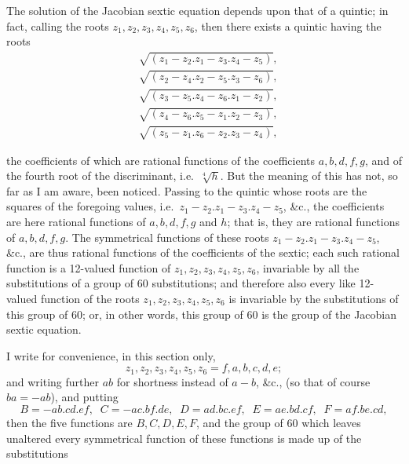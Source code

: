 \documentclass[11pt]{article}
\begin{document}
\medskip\noindent
The solution of the Jacobian sextic equation depends upon that of a
quintic; in fact, calling the roots $z_{1},z_{2},z_{3},z_{4},z_{5},z_{6}$,
then there exists a quintic having the roots
\begin{align*}
  & \sqrt{(z_{1}-z_{2}.z_{1}-z_{3}.z_{4}-z_{5})},\\
  & \sqrt{(z_{2}-z_{4}.z_{2}-z_{5}.z_{3}-z_{6})},\\
  & \sqrt{(z_{3}-z_{5}.z_{4}-z_{6}.z_{1}-z_{2})},\\
  & \sqrt{(z_{4}-z_{6}.z_{5}-z_{1}.z_{2}-z_{3})},\\
  & \sqrt{(z_{5}-z_{1}.z_{6}-z_{2}.z_{3}-z_{4})},
\end{align*}

\newpage
\noindent
the coefficients of which are rational functions of the
coefficients $a,b,d,f,g$, and of the fourth root of the
discriminant, i.e.\ $\sqrt[4]{h}$.  But the meaning of this has
not, so far as I am aware, been noticed.  Passing to the quintic
whose roots are the squares of the foregoing values, i.e.\
$z_{1}-z_{2}.z_{1}-z_{3}.z_{4}-z_{5}$, \&c., the coefficients are
here rational functions of $a,b,d,f,g$ and $h$; that is, they are
rational functions of $a,b,d,f,g$.  The symmetrical functions of
these roots $z_{1}-z_{2}.z_{1}-z_{3}.z_{4}-z_{5}$, \&c., are thus
rational functions of the coefficients of the sextic; each such
rational function is a 12-valued function of
$z_{1},z_{2},z_{3},z_{4},z_{5},z_{6}$, invariable by all the
substitutions of a group of 60 substitutions; and therefore also
every like 12-valued function of the roots
$z_{1},z_{2},z_{3},z_{4},z_{5},z_{6}$ is invariable by the
substitutions of this group of 60; or, in other words, this group
of 60 is the group of the Jacobian sextic equation.

\medskip
I write for convenience, in this section only,
\[
  z_{1},z_{2},z_{3},z_{4},z_{5},z_{6}=f,a,b,c,d,e;
\]
and writing further $ab$ for shortness instead of $a-b$, \&c., (so
that of course $ba=-ab$), and putting
\[
  B=-ab.cd.ef,\;\;
  C=-ac.bf.de,\;\;
  D=ad.bc.ef,\;\;
  E=ae.bd.cf,\;\;
  F=af.be.cd,
\]
then the five functions are $B,C,D,E,F$, and the group of 60 which
leaves unaltered every symmetrical function of these functions is
made up of the substitutions
\medskip
\end{document}
